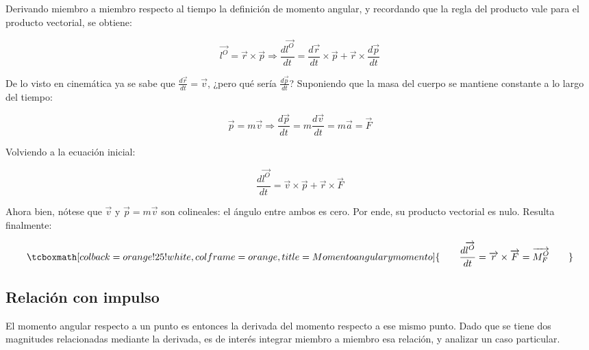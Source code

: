 \documentclass{article}
\begin{document}
Derivando miembro a miembro respecto al tiempo la definición de momento angular, y recordando que la regla del producto vale para el producto vectorial, se obtiene:

\begin{equation}
\overrightarrow{l^O} = \overrightarrow{r} \times \overrightarrow{p} \Rightarrow \frac{d\overrightarrow{l^O}}{dt} = \frac{d\overrightarrow{r}}{dt} \times \overrightarrow{p} + \overrightarrow{r} \times \frac{d\overrightarrow{p}}{dt}
\end{equation}

De lo visto en cinemática ya se sabe que $\frac{d\overrightarrow{r}}{dt} = \overrightarrow{v}$, ¿pero qué sería $\frac{d\overrightarrow{p}}{dt}$? Suponiendo que la masa del cuerpo se mantiene constante a lo largo del tiempo:

\begin{equation}
\overrightarrow{p} = m \overrightarrow{v} \Rightarrow \frac{d\overrightarrow{p}}{dt} = m \frac{d\overrightarrow{v}}{dt} = m \overrightarrow{a} = \overrightarrow{F}
\end{equation}

Volviendo a la ecuación inicial:

\begin{equation}
\frac{d\overrightarrow{l^O}}{dt} = \overrightarrow{v} \times \overrightarrow{p} + \overrightarrow{r} \times \overrightarrow{F}
\end{equation}

Ahora bien, nótese que $\overrightarrow{v}$ y $\overrightarrow{p} = m \overrightarrow{v}$ son colineales: el ángulo entre ambos es cero. Por ende, su producto vectorial es nulo. Resulta finalmente:

\begin{equation}
\tcboxmath[colback=orange!25!white,colframe=orange,title=Momento angular y momento]{
\quad \quad \frac{d\overrightarrow{l^O}}{dt} = \overrightarrow{r} \times \overrightarrow{F} = \overrightarrow{M^O_F} \quad \quad
}
\end{equation}

\subsection{Relación con impulso}

El momento angular respecto a un punto es entonces la derivada del momento respecto a ese mismo punto. Dado que se tiene dos magnitudes relacionadas mediante la derivada, es de interés integrar miembro a miembro esa relación, y analizar un caso particular.
\end{document}
